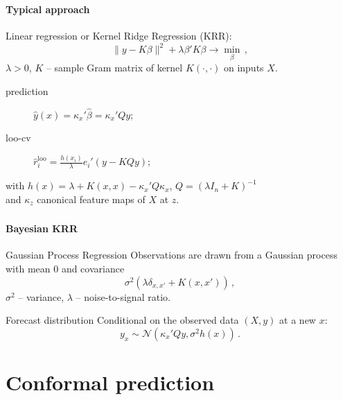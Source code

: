 \documentclass[t]{beamer}  %
\newcommand{\Ncal}{\mathcal{N}}
\begin{document}

\begin{frame}[c]\frametitle{\insertsection}
  \framesubtitle{Typical approach}
  Linear regression or Kernel Ridge Regression (KRR):
  $$ \|y - K\beta \|^2 + \lambda \beta' K \beta \to \min_\beta \,, $$
  $\lambda > 0$, $K$ -- sample Gram matrix of kernel $K(\cdot,\cdot)$ on inputs $X$.
  \vspace{\baselineskip}
  \begin{description}
    \item[prediction] $\hat{y}(x) = \kappa_x' \hat{\beta} = \kappa_x' Q y$;
    \item[loo-cv] $\hat{r}^{\text{loo}}_i = \frac{h(x_i)}{\lambda} e_i'(y - K Q y)$;
  \end{description}
  with $h(x) = \lambda + K(x,x) - \kappa_x' Q \kappa_x$, $Q = (\lambda I_n + K)^{-1}$
  \hfill\\ and $\kappa_z$ canonical feature maps of $X$ at $z$.
\end{frame}

\begin{frame}[c]\frametitle{\insertsection}
  \framesubtitle{Bayesian KRR}
  \begin{block}{Gaussian Process Regression}  
    Observations are drawn from a Gaussian process with mean $0$ and covariance
    $$ \sigma^2(\lambda\delta_{x,x'} + K(x,x')) \,,$$
    $\sigma^2$ -- variance, $\lambda$ -- noise-to-signal ratio.
  \end{block}
  \vspace{\baselineskip}
  \begin{block}{Forecast distribution}
  Conditional on the observed data $(X, y)$ at a new $x$:
  $$ y_x \sim \Ncal(\kappa_x' Q y, \sigma^2 h(x)) \,. $$
  \end{block}
\end{frame}


\section{Conformal prediction} %
\label{sec:conformal_prediction}
\end{document}
